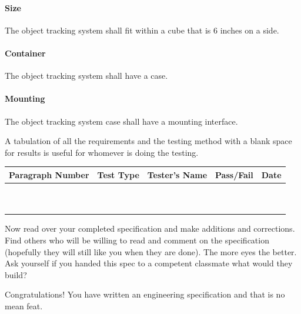 \paragraph{Size}
The object tracking system shall fit within a cube that is 6 inches on a side.

\paragraph{Container}
The object tracking system shall have a case. 

\paragraph{Mounting}
The object tracking system case shall have a mounting interface. 



\begin{slshape}
	\color{blue}
  A tabulation of all the requirements and the testing method with a blank space for results is useful for whomever is doing the testing.
\end{slshape}

\begin{table}[h]
\centering
\begin{tabular}{|c|c|C{6cm}|c|c|}
\hline
\textbf{Paragraph Number} & \textbf{Test Type}& 
\textbf{Tester's Name} & \textbf{Pass/Fail} & \textbf{Date} \\
\hline
 & & & & \\
\hline
 & & & & \\
\hline
 & & & & \\
\hline
 & & & & \\
\hline
 & & & & \\
\hline
 & & & & \\
\hline
 & & & & \\
\hline
 & & & & \\
\hline
 & & & & \\
\hline
 & & & & \\
\hline
\end{tabular}
\end{table}

\begin{slshape}
\color{blue}
\StopSign Now read over your completed specification and make additions and corrections.  Find others who will be willing to read and comment on the specification (hopefully they will still like you when they are done).  The more eyes the better.  Ask yourself if you handed this spec to a competent classmate what would they build?
\bigskip

Congratulations!  You have written an engineering specification and that is no mean feat.
\end{slshape}